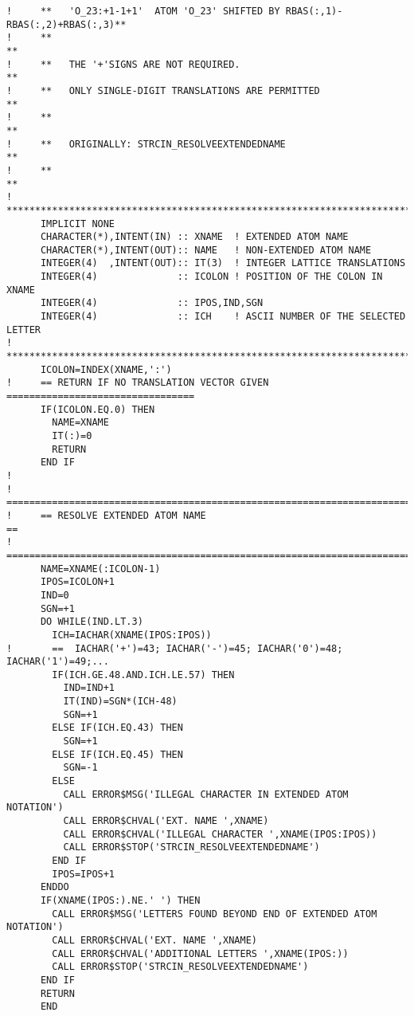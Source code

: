 \documentclass[11pt,a4paper]{report}
\begin{document}
\begin{verbatim}
!     **   'O_23:+1-1+1'  ATOM 'O_23' SHIFTED BY RBAS(:,1)-RBAS(:,2)+RBAS(:,3)**
!     **                                                                      **
!     **   THE '+'SIGNS ARE NOT REQUIRED.                                     **
!     **   ONLY SINGLE-DIGIT TRANSLATIONS ARE PERMITTED                       **
!     **                                                                      **
!     **   ORIGINALLY: STRCIN_RESOLVEEXTENDEDNAME                             **
!     **                                                                      **
!     **************************************************************************
      IMPLICIT NONE
      CHARACTER(*),INTENT(IN) :: XNAME  ! EXTENDED ATOM NAME
      CHARACTER(*),INTENT(OUT):: NAME   ! NON-EXTENDED ATOM NAME
      INTEGER(4)  ,INTENT(OUT):: IT(3)  ! INTEGER LATTICE TRANSLATIONS
      INTEGER(4)              :: ICOLON ! POSITION OF THE COLON IN XNAME
      INTEGER(4)              :: IPOS,IND,SGN
      INTEGER(4)              :: ICH    ! ASCII NUMBER OF THE SELECTED LETTER
!     **************************************************************************
      ICOLON=INDEX(XNAME,':')
!     == RETURN IF NO TRANSLATION VECTOR GIVEN =================================
      IF(ICOLON.EQ.0) THEN
        NAME=XNAME
        IT(:)=0
        RETURN
      END IF
!
!     ==========================================================================
!     == RESOLVE EXTENDED ATOM NAME                                           ==
!     ==========================================================================
      NAME=XNAME(:ICOLON-1)
      IPOS=ICOLON+1
      IND=0
      SGN=+1
      DO WHILE(IND.LT.3) 
        ICH=IACHAR(XNAME(IPOS:IPOS))
!       ==  IACHAR('+')=43; IACHAR('-')=45; IACHAR('0')=48; IACHAR('1')=49;...
        IF(ICH.GE.48.AND.ICH.LE.57) THEN
          IND=IND+1
          IT(IND)=SGN*(ICH-48)
          SGN=+1
        ELSE IF(ICH.EQ.43) THEN
          SGN=+1
        ELSE IF(ICH.EQ.45) THEN
          SGN=-1
        ELSE
          CALL ERROR$MSG('ILLEGAL CHARACTER IN EXTENDED ATOM NOTATION')  
          CALL ERROR$CHVAL('EXT. NAME ',XNAME)
          CALL ERROR$CHVAL('ILLEGAL CHARACTER ',XNAME(IPOS:IPOS))
          CALL ERROR$STOP('STRCIN_RESOLVEEXTENDEDNAME')
        END IF
        IPOS=IPOS+1
      ENDDO
      IF(XNAME(IPOS:).NE.' ') THEN
        CALL ERROR$MSG('LETTERS FOUND BEYOND END OF EXTENDED ATOM NOTATION')  
        CALL ERROR$CHVAL('EXT. NAME ',XNAME)
        CALL ERROR$CHVAL('ADDITIONAL LETTERS ',XNAME(IPOS:))
        CALL ERROR$STOP('STRCIN_RESOLVEEXTENDEDNAME')
      END IF
      RETURN
      END
\end{verbatim}
\end{document}
